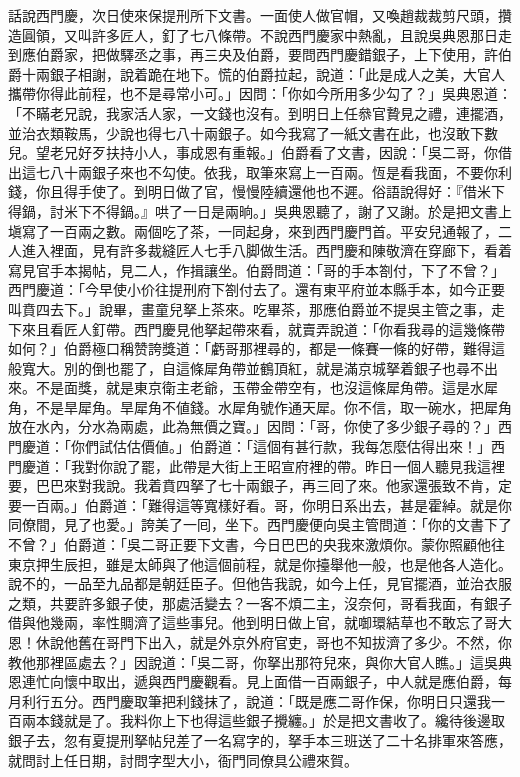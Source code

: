 話說西門慶，次日使來保提刑所下文書。一面使人做官帽，又喚趙裁裁剪尺頭，攢造圓領，又叫許多匠人，釘了七八條帶。不說西門慶家中熱亂，且說吳典恩那日走到應伯爵家，把做驛丞之事，再三央及伯爵，要問西門慶錯銀子，上下使用，許伯爵十兩銀子相謝，說着跪在地下。慌的伯爵拉起，說道：「此是成人之美，大官人攜帶你得此前程，也不是尋常小可。」因問：「你如今所用多少勾了？」吳典恩道：「不瞞老兄說，我家活人家，一文錢也沒有。到明日上任叅官贄見之禮，連擺酒，並治衣類鞍馬，少說也得七八十兩銀子。如今我寫了一紙文書在此，也沒敢下數兒。望老兄好歹扶持小人，事成恩有重報。」伯爵看了文書，因說：「吳二哥，你借出這七八十兩銀子來也不勾使。依我，取筆來寫上一百兩。恆是看我面，不要你利錢，你且得手使了。到明日做了官，慢慢陸續還他也不遲。俗語說得好：『借米下得鍋，討米下不得鍋。』哄了一日是兩晌。」{}吳典恩聽了，謝了又謝。於是把文書上塡寫了一百兩之數。兩個吃了茶，一同起身，來到西門慶門首。平安兒通報了，二人進入裡面，見有許多裁縫匠人七手八脚做生活。西門慶和陳敬濟在穿廊下，看着寫見官手本揭帖，見二人，作揖讓坐。伯爵問道：「哥的手本劄付，下了不曾？」西門慶道：「今早使小价往提刑府下劄付去了。還有東平府並本縣手本，如今正要叫賁四去下。」說畢，畫童兒拏上茶來。吃畢茶，那應伯爵並不提吳主管之事，{}走下來且看匠人釘帶。西門慶見他拏起帶來看，就賣弄說道：「你看我尋的這幾條帶如何？」伯爵極口稱赞誇獎道：「虧哥那裡尋的，都是一條賽一條的好帶，難得這般寬大。別的倒也罷了，自這條犀角帶並鶴頂紅，就是滿京城拏着銀子也尋不出來。不是面獎，就是東京衛主老爺，玉帶金帶空有，也沒這條犀角帶。這是水犀角，不是旱犀角。旱犀角不値錢。水犀角號作通天犀。你不信，取一碗水，把犀角放在水內，分水為兩處，此為無價之寶。」{}因問：「哥，你使了多少銀子尋的？」西門慶道：「你們試估估價値。」伯爵道：「這個有甚行款，我每怎麼估得出來！」西門慶道：「我對你說了罷，此帶是大街上王昭宣府裡的帶。昨日一個人聽見我這裡要，巴巴來對我說。我着賁四拏了七十兩銀子，再三囘了來。他家還張致不肯，定要一百兩。」伯爵道：「難得這等寬樣好看。哥，你明日系出去，甚是霍綽。就是你同僚間，見了也愛。」誇美了一囘，坐下。西門慶便向吳主管問道：「你的文書下了不曾？」{}伯爵道：「吳二哥正要下文書，今日巴巴的央我來激煩你。蒙你照顧他往東京押生辰担，雖是太師與了他這個前程，就是你擡舉他一般，也是他各人造化。說不的，一品至九品都是朝廷臣子。但他告我說，如今上任，見官擺酒，並治衣服之類，共要許多銀子使，那處活變去？一客不煩二主，沒奈何，哥看我面，{}有銀子借與他幾兩，率性賙濟了這些事兒。他到明日做上官，就啣環結草也不敢忘了哥大恩！休說他舊在哥門下出入，就是外京外府官吏，哥也不知拔濟了多少。不然，你教他那裡區處去？」{}因說道：「吳二哥，你拏出那符兒來，{}與你大官人瞧。」這吳典恩連忙向懷中取出，遞與西門慶觀看。見上面借一百兩銀子，中人就是應伯爵，每月利行五分。西門慶取筆把利錢抹了，說道：「既是應二哥作保，你明日只還我一百兩本錢就是了。我料你上下也得這些銀子攪纏。」於是把文書收了。纔待後邊取銀子去，忽有夏提刑拏帖兒差了一名寫字的，拏手本三班送了二十名排軍來答應，{}就問討上任日期，討問字型大小，衙門同僚具公禮來賀。